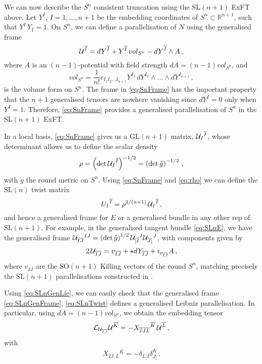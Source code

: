 \documentclass[a4paper, 11pt]{article}
\numberwithin{equation}{section}
\newcommand{\ov}[1]{\overline{#1}}
\newcommand{\SL}[1]{\mathrm{SL}( #1 )}
\newcommand{\GL}[1]{\mathrm{GL}( #1 )}
\newcommand{\SO}[1]{\mathrm{SO}( #1 )}
\newcommand{\+}{\oplus}
\newcommand{\gL}{\mathcal{L}}
\newcommand{\cU}{{\cal U}}
\newcommand{\fl}[1]{\ov{#1}}
\begin{document}
We can now describe the $S^n$ consistent truncation using the $\SL{n+1}$ ExFT above. Let $Y^I$, $I = 1, \ldots, n+1$ be the embedding coordinates of $S^{n} \subset \mathbb{R}^{n+1}$, such that $Y^I\, Y_I = 1$. On $S^n$, we can define a parallelisation of $N$ using the generalised frame
\begin{equation}\label{eq:SnFrame}
	\cU^{\fl{I}} = dY^{\fl{I}} + Y^{\fl{I}}\, vol_{S^n} - dY^{\fl{I}} \wedge A \,,
\end{equation}
where $A$ is an $(n-1)$-potential with field strength $dA = (n-1) vol_{S^n}$, and
\begin{equation}
	vol_{S^n} = \frac{1}{n!}\epsilon_{I_1 I_2 \ldots I_{n+1}} Y^{I_1}\, dY^{I_2} \wedge \ldots \wedge dY^{I_{n+1}} \,,
\end{equation}
is the volume form on $S^n$. The frame in \eqref{eq:SnFrame} has the important property that the $n+1$ generalised tensors are nowhere vanishing since $dY^I = 0$ only when $Y^I = 1$. Therefore, \eqref{eq:SnFrame} provides a generalised parallelisation of $S^n$ in the $\SL{n+1}$ ExFT.

In a local basis, \eqref{eq:SnFrame} gives us a $\GL{n+1}$ matrix, $\cU_I{}^{\fl{I}}$, whose determinant allows us to define the scalar density
\begin{equation} \label{eq:rho}
	\rho = \left(\det \cU_I{}^{\fl{I}}\right)^{-1/2} = \left(\det \mathring{g}\right)^{-1/2} \,,
\end{equation}
with $\mathring{g}$ the round metric on $S^n$. Using \eqref{eq:SnFrame} and \eqref{eq:rho} we can define the $\SL{n}$ twist matrix
\begin{equation} \label{eq:SLnFrame}
	U_I{}^{\fl{I}} = \rho^{2/(n+1)}\, \cU_I{}^{\fl{I}} \,,
\end{equation}
and hence a generalised frame for $E$ or a generalised bundle in any other rep of $\SL{n+1}$. For example, in the generalised tangent bundle \eqref{eq:SLnE}, we have the generalised frame $\cU_{\fl{I}\fl{J}}{}^{IJ} = \left(\det \mathring{g}\right)^{1/2} \cU_{[\fl{I}}{}^{I} \cU_{\fl{J}]}{}^J$, with components given by
\begin{equation} \label{eq:SLnGenFrame}
	2\, \cU_{\fl{I}\fl{J}} = v_{\fl{I}\fl{J}} + \star dY_{\fl{I}\fl{J}} + \imath_{v_{\fl{I}\fl{J}}} A \,,
\end{equation}
where $v_{\fl{I}\fl{J}}$ are the $\SO{n+1}$ Killing vectors of the round $S^n$, matching precisely the $\SL{n+1}$ parallelisations constructed in \cite{Lee:2014mla}.

Using \eqref{eq:SLnGenLie}, we can easily check that the generalised frame  \eqref{eq:SLnGenFrame}, \eqref{eq:SLnTwist} defines a generalised Leibniz parallelisation. In particular, using $dA = (n-1) vol_{S^n}$, we obtain the embedding tensor
\begin{equation}
	\gL_{\cU_{\fl{I}\fl{J}}} \cU^{\fl{K}} = - X_{\fl{I}\fl{J}\fl{L}}{}^{\fl{K}}\, \cU^{\fl{L}} \,,
\end{equation}
with
\begin{equation} \label{eq:SLnEmbeddingTensor}
	X_{\fl{I}\fl{J},\fl{L}}{}^{\fl{K}} = - \delta_{\fl{L}[\fl{I}} \delta_{\fl{J}]}^{\fl{K}} \,.
\end{equation}
\end{document}

